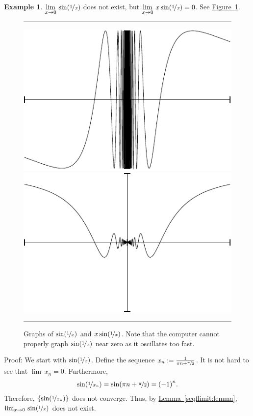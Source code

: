 \documentclass[12pt]{book}
\newenvironment{myfigureht}{%
\begin{figure}[h!t]
\noindent\rule{\textwidth}{0.4pt}\vspace{12pt}\par\centering}%
{\par\noindent\rule{\textwidth}{0.4pt}
\end{figure}}
\theoremstyle{plain}
\theoremstyle{remark}
\theoremstyle{definition}
\theoremstyle{exercise}
\theoremstyle{example}
\newtheorem{example}[thm]{Example}
\newcommand{\figureref}[1]{\hyperref[#1]{Figure~\ref*{#1}}}
\newcommand{\lemmaref}[1]{\hyperref[#1]{Lemma~\ref*{#1}}}
\begin{document}
\begin{example}
$\displaystyle \lim_{x \to 0} \, \sin( \nicefrac{1}{x} )$
does not exist, but 
$\displaystyle \lim_{x \to 0} \, x\sin( \nicefrac{1}{x} ) = 0$.
See \figureref{figsin1x}.

\begin{myfigureht}
\includegraphics{figures/sin1xfig}
\qquad
\includegraphics{figures/xsin1xfig}
\caption{Graphs of $\sin(\nicefrac{1}{x})$ and $x \sin(\nicefrac{1}{x})$.
Note that the computer cannot properly graph $\sin(\nicefrac{1}{x})$
near zero as it oscillates too fast.\label{figsin1x}}
\end{myfigureht}

Proof:
We start with $\sin(\nicefrac{1}{x})$.  Define the sequence
$x_n := \frac{1}{\pi n + \nicefrac{\pi}{2}}$.  It is not hard to see
that $\lim\, x_n = 0$.  Furthermore,
\begin{equation*}
\sin ( \nicefrac{1}{x_n} )
=
\sin (\pi n + \nicefrac{\pi}{2})
= {(-1)}^n .
\end{equation*}
Therefore, $\{ \sin ( \nicefrac{1}{x_n} ) \}$ does not converge.
Thus, by
\lemmaref{seqflimit:lemma}, 
$\lim_{x \to 0} \, \sin( \nicefrac{1}{x} )$ does not exist.


\end{example}
\end{document}
